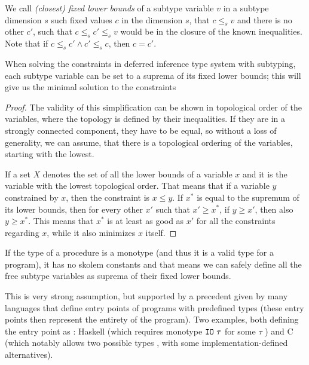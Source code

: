 We call \emph{(closest) fixed lower bounds} of a subtype variable $v$ in a subtype dimension $s$ such fixed values $c$ in the dimension $s$, that $c \leq_s v$ and there is no other $c'$, such that $c \leq_s c' \leq_s v$ would be in the closure of the known inequalities. Note that if $c \leq_s c' \land c' \leq_s c$, then $c = c'$.

\begin{lemma} When solving the constraints in deferred inference type system with subtyping, each subtype variable can be set to a suprema of its fixed lower bounds; this will give us the minimal solution to the constraints
    \label{suprema_subtyping}

    \begin{proof}
        The validity of this simplification can be shown in topological order of the variables, where the topology is defined by their inequalities. If they are in a strongly connected component, they have to be equal, so without a loss of generality, we can assume, that there is a topological ordering of the variables, starting with the lowest.

        If a set $X$ denotes the set of all the lower bounds of a variable $x$ and it is the variable with the lowest topological order. That means that if a variable $y$ constrained by $x$, then the constraint is $x \leq y$. If $x^\ast$ is equal to the supremum of its lower bounds, then for every other $x'$ such that $x' \geq x^\ast$, if $y \geq x'$, then also $y \geq x^\ast$. This means that $x^\ast$ is at least as good as $x'$ for all the constraints regarding $x$, while it also minimizes $x$ itself.
    \end{proof}

\end{lemma}

\begin{observe}
    If the type of a procedure is a monotype (and thus it is a valid type for a program), it has no skolem constants and that means we can safely define all the free subtype variables as suprema of their fixed lower bounds.

    This is very strong assumption, but supported by a precedent given by many languages that define entry points of programs with predefined types (these entry points then represent the entirety of the program). Two examples, both defining the entry point as : Haskell (which requires monotype $\mathtt{IO}\ \tau$ for some $\tau$ \cite{haskell2010}) and C (which notably allows two possible types \cite{cstandard2018}, with some implementation-defined alternatives).
\end{observe}


